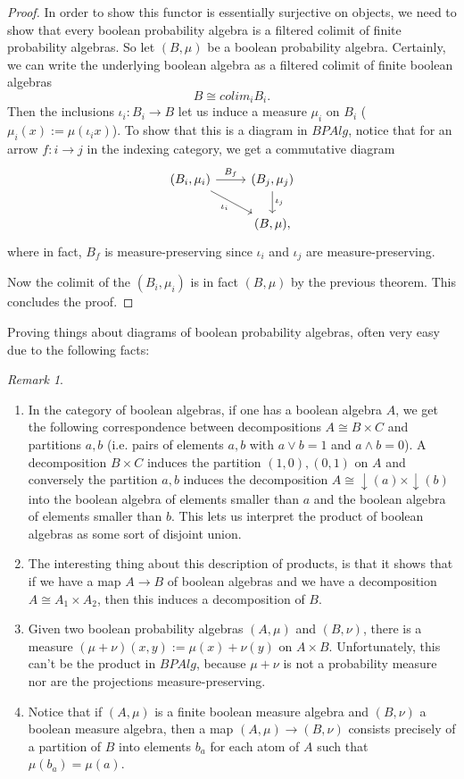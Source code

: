 \documentclass[a4paper]{amsproc}
\theoremstyle{plain}
\theoremstyle{definition}
\theoremstyle{remark}
\newtheorem{remark}{Remark}[section]
\numberwithin{equation}{section}
\begin{document}
\begin{proof}
In order to show this functor is essentially surjective on objects, we need to show that every boolean probability algebra is a filtered colimit of finite probability algebras. So let $(B, \mu)$ be a boolean probability algebra. Certainly, we can write the underlying boolean algebra as a filtered colimit of finite boolean algebras
\[
B \cong colim_i B_i.
\]
Then the inclusions $\iota_i: B_i \to B$ let us induce a measure $\mu_i$ on $B_i$ ($\mu_i(x) := \mu(\iota_i x)$). To show that this is a diagram in $BPAlg$, notice that for an arrow $f: i \to j$ in the indexing category, we get a commutative diagram
\[
\begin{tikzcd}
{(B_i,\mu_i)} \arrow[r, "B_f"] \arrow[rd, "\iota_i"'] & {(B_j,\mu_j)} \arrow[d, "\iota_j"] \\
                                                      & {(B,\mu)}                         ,
\end{tikzcd}
\]
where in fact, $B_f$ is measure-preserving since $\iota_i$ and $\iota_j$ are measure-preserving.

Now the colimit of the $(B_i, \mu_i)$ is in fact $(B, \mu)$ by the previous theorem. This concludes the proof.
\end{proof}

Proving things about diagrams of boolean probability algebras, often very easy due to the following facts:

\begin{remark}\label{partitions}
\begin{enumerate}
\item In the category of boolean algebras, if one has a boolean algebra $A$, we get the following correspondence between decompositions $A \cong B \times C$ and partitions $a,b$ (i.e. pairs of elements $a,b$ with $a \vee b = 1$ and $a \wedge b = 0$). A decomposition $B \times C$ induces the partition $(1,0), (0,1)$ on $A$ and conversely the partition $a,b$ induces the decomposition $A \cong \downarrow(a) \times \downarrow(b)$ into the boolean algebra of elements smaller than $a$ and the boolean algebra of elements smaller than $b$. This lets us interpret the product of boolean algebras as some sort of disjoint union.
\item The interesting thing about this description of products, is that it shows that if we have a map $A \to B$ of boolean algebras and we have a decomposition $A \cong A_1 \times A_2$, then this induces a decomposition of $B$.
\item Given two boolean probability algebras $(A, \mu)$ and $(B, \nu)$, there is a measure $(\mu + \nu)(x,y) := \mu(x) + \nu(y)$ on $A \times B$. Unfortunately, this can't be the product in $BPAlg$, because $\mu + \nu$ is not a probability measure nor are the projections measure-preserving.
\item Notice that if $(A,\mu)$ is a finite boolean measure algebra and $(B,\nu)$ a boolean measure algebra, then a map $(A,\mu) \to (B,\nu)$ consists precisely of a partition of $B$ into elements $b_a$ for each atom of $A$ such that $\mu(b_a) = \mu(a)$.
\end{enumerate}
\end{remark}
\end{document}

